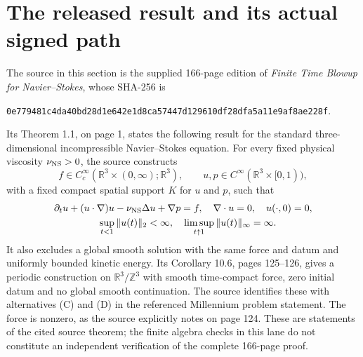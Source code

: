 \documentclass[11pt]{article}
\begin{document}
\section{The released result and its actual signed path}
\label{nsprop:source}
The source in this section is the supplied 166-page edition of
\emph{Finite Time Blowup for Navier--Stokes}, whose SHA-256 is
\begin{center}\footnotesize
\texttt{0e779481c4da40bd28d1e642e1d8ca57447d129610df28dfa5a11e9af8ae228f}.
\end{center}
Its Theorem 1.1, on page 1, states the following result for the standard
three-dimensional incompressible Navier--Stokes equation. For every
fixed physical viscosity $\nu_{\rm NS}>0$, the source constructs
\[
 f\in C^\infty_c(\mathbb R^3\times(0,\infty);\mathbb R^3),
 \qquad u,p\in C^\infty(\mathbb R^3\times[0,1)),
\]
with a fixed compact spatial support $K$ for $u$ and $p$, such that
\begin{equation}
 \begin{gathered}
 \partial_tu+(u\cdot\nabla)u-\nu_{\rm NS}\Delta u+\nabla p=f,
 \quad \nabla\cdot u=0,\quad u(\cdot,0)=0,\\
 \quad \sup_{t<1}\|u(t)\|_2<\infty,\quad
 \limsup_{t\uparrow1}\|u(t)\|_\infty=\infty .
 \end{gathered}
 \label{nsprop:source_theorem}
\end{equation}
It also excludes a global smooth solution with the same force and datum
and uniformly bounded kinetic energy. Its Corollary 10.6, pages 125--126,
gives a periodic construction on $\mathbb R^3/\mathbb Z^3$ with smooth
time-compact force, zero initial datum and no global smooth continuation.
The source identifies these with alternatives (C) and (D) in the
referenced Millennium problem statement. The force is nonzero, as the
source explicitly notes on page 124. These are statements of the cited
source theorem; the finite algebra checks in this lane do not constitute
an independent verification of the complete 166-page proof.
\end{document}

